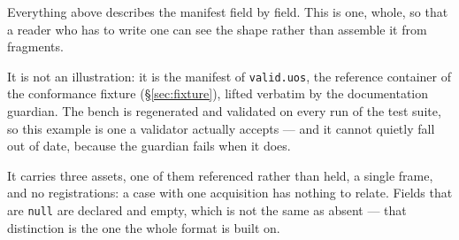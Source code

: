 \documentclass[11pt,a4paper]{article}
\newcommand{\code}[1]{\texttt{\small #1}}
\begin{document}
Everything above describes the manifest field by field. This is one, whole, so that a
reader who has to write one can see the shape rather than assemble it from fragments.

It is not an illustration: it is the manifest of \code{valid.uos}, the reference container
of the conformance fixture (\S\ref{sec:fixture}), lifted verbatim by the documentation
guardian. The bench is regenerated and validated on every run of the test suite, so this
example is one a validator actually accepts --- and it cannot quietly fall out of date,
because the guardian fails when it does.

It carries three assets, one of them referenced rather than held, a single frame, and no
registrations: a case with one acquisition has nothing to relate. Fields that are
\code{null} are declared and empty, which is not the same as absent --- that distinction is
the one the whole format is built on.
\end{document}
